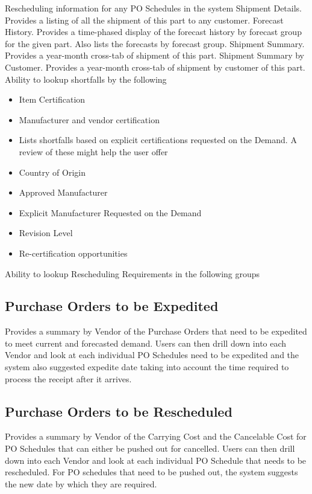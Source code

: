 \documentclass[letterpaper,10pt,english]{sphinxmanual}
\begin{document}
Rescheduling information for any PO Schedules in the system Shipment
Details. Provides a listing of all the shipment of this part to any
customer. Forecast History. Provides a time-phased display of the
forecast history by forecast group for the given part. Also lists the
forecasts by forecast group. Shipment Summary. Provides a year-month
cross-tab of shipment of this part. Shipment Summary by Customer.
Provides a year-month cross-tab of shipment by customer of this part.
Ability to lookup shortfalls by the following
\begin{itemize}
\item {} 
Item Certification

\item {} 
Manufacturer and vendor certification

\item {} 
Lists shortfalls based on explicit certifications requested on the
Demand. A review of these might help the user offer

\item {} 
Country of Origin

\item {} 
Approved Manufacturer

\item {} 
Explicit Manufacturer Requested on the Demand

\item {} 
Revision Level

\item {} 
Re-certification opportunities

\end{itemize}

Ability to lookup Rescheduling Requirements in the following groups


\subsection{Purchase Orders to be Expedited}
\label{APS/Introduction:purchase-orders-to-be-expedited}
Provides a summary by Vendor of the Purchase Orders that need to be
expedited to meet current and forecasted demand. Users can then drill
down into each Vendor and look at each individual PO Schedules need to
be expedited and the system also suggested expedite date taking into
account the time required to process the receipt after it arrives.


\subsection{Purchase Orders to be Rescheduled}
\label{APS/Introduction:purchase-orders-to-be-rescheduled}
Provides a summary by Vendor of the Carrying Cost and the Cancelable
Cost for PO Schedules that can either be pushed out for cancelled. Users
can then drill down into each Vendor and look at each individual PO
Schedule that needs to be rescheduled. For PO schedules that need to be
pushed out, the system suggests the new date by which they are required.
\end{document}
